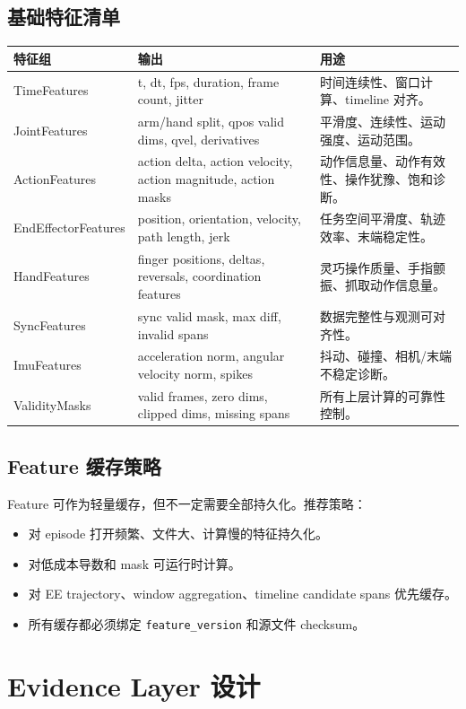 \documentclass[UTF8,zihao=-4,oneside,openany]{ctexrep}
\newcommand{\Code}[1]{\texttt{#1}}
\begin{document}
\subsection{基础特征清单}

\begin{longtable}{L{3.5cm} L{4.5cm} L{6cm}}
\toprule
特征组 & 输出 & 用途 \\
\midrule
TimeFeatures & t, dt, fps, duration, frame count, jitter & 时间连续性、窗口计算、timeline 对齐。 \\
JointFeatures & arm/hand split, qpos valid dims, qvel, derivatives & 平滑度、连续性、运动强度、运动范围。 \\
ActionFeatures & action delta, action velocity, action magnitude, action masks & 动作信息量、动作有效性、操作犹豫、饱和诊断。 \\
EndEffectorFeatures & position, orientation, velocity, path length, jerk & 任务空间平滑度、轨迹效率、末端稳定性。 \\
HandFeatures & finger positions, deltas, reversals, coordination features & 灵巧操作质量、手指颤振、抓取动作信息量。 \\
SyncFeatures & sync valid mask, max diff, invalid spans & 数据完整性与观测可对齐性。 \\
ImuFeatures & acceleration norm, angular velocity norm, spikes & 抖动、碰撞、相机/末端不稳定诊断。 \\
ValidityMasks & valid frames, zero dims, clipped dims, missing spans & 所有上层计算的可靠性控制。 \\
\bottomrule
\end{longtable}

\subsection{Feature 缓存策略}

Feature 可作为轻量缓存，但不一定需要全部持久化。推荐策略：

\begin{itemize}
\item 对 episode 打开频繁、文件大、计算慢的特征持久化。
\item 对低成本导数和 mask 可运行时计算。
\item 对 EE trajectory、window aggregation、timeline candidate spans 优先缓存。
\item 所有缓存都必须绑定 \Code{feature\_version} 和源文件 checksum。
\end{itemize}

\section{Evidence Layer 设计}
\end{document}
